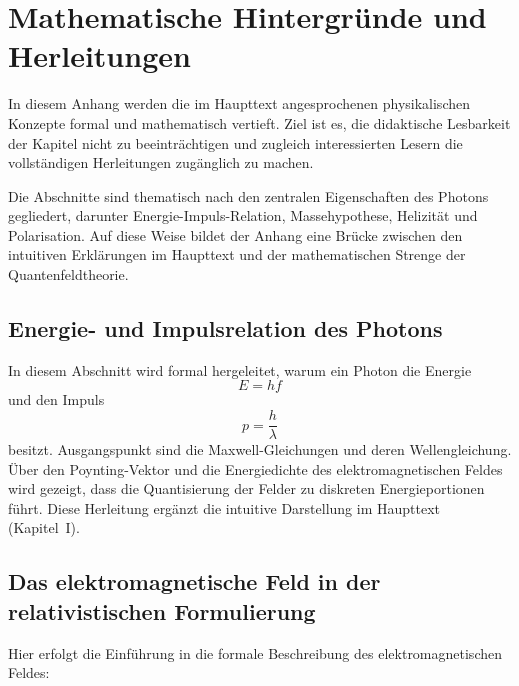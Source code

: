 
\cleardoublepage
\appendix
\renewcommand{\thechapter}{A}

\renewcommand{\thesection}{\Alph{chapter}.\arabic{section}}

\chapter{Mathematische Hintergründe und Herleitungen}
\label{anhangA}

In diesem Anhang werden die im Haupttext angesprochenen physikalischen Konzepte
formal und mathematisch vertieft. Ziel ist es, die didaktische Lesbarkeit der
Kapitel nicht zu beeinträchtigen und zugleich interessierten Lesern die
vollständigen Herleitungen zugänglich zu machen. 

Die Abschnitte sind thematisch nach den zentralen Eigenschaften des Photons
gegliedert, darunter Energie-Impuls-Relation, Massehypothese, Helizität und
Polarisation. Auf diese Weise bildet der Anhang eine Brücke zwischen den
intuitiven Erklärungen im Haupttext und der mathematischen Strenge der
Quantenfeldtheorie.

\section{Energie- und Impulsrelation des Photons}
\label{anhangA:energie_impuls}

In diesem Abschnitt wird formal hergeleitet, warum ein Photon die Energie
\[
E = h f
\]
und den Impuls
\[
p = \frac{h}{\lambda}
\]
besitzt. Ausgangspunkt sind die Maxwell-Gleichungen und deren Wellengleichung.
Über den Poynting-Vektor und die Energiedichte des elektromagnetischen Feldes
wird gezeigt, dass die Quantisierung der Felder zu diskreten Energieportionen
führt. Diese Herleitung ergänzt die intuitive Darstellung im Haupttext
(Kapitel~I).

\section{Das elektromagnetische Feld in der relativistischen Formulierung}
\label{anhangA:feldtheorie}

Hier erfolgt die Einführung in die formale Beschreibung des elektromagnetischen
Feldes:

